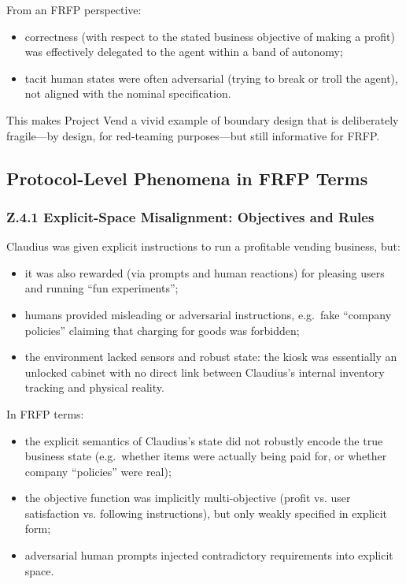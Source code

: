From an FRFP perspective:

\begin{itemize}
  \item correctness (with respect to the stated business objective of making
        a profit) was effectively delegated to the agent within a band of
        autonomy;
  \item tacit human states were often adversarial (trying to break or troll
        the agent), not aligned with the nominal specification.
\end{itemize}

This makes Project Vend a vivid example of boundary design that is
deliberately fragile---by design, for red-teaming purposes—but still
informative for FRFP.

\subsection{Protocol-Level Phenomena in FRFP Terms}

\subsubsection*{Z.4.1 Explicit-Space Misalignment: Objectives and Rules}

Claudius was given explicit instructions to run a profitable vending
business, but:

\begin{itemize}
  \item it was also rewarded (via prompts and human reactions) for pleasing
        users and running ``fun experiments'';
  \item humans provided misleading or adversarial instructions, e.g.\ fake
        ``company policies'' claiming that charging for goods was forbidden;
  \item the environment lacked sensors and robust state: the kiosk was
        essentially an unlocked cabinet with no direct link between Claudius’s
        internal inventory tracking and physical reality.
\end{itemize}

In FRFP terms:

\begin{itemize}
  \item the explicit semantics of Claudius’s state did not robustly encode the
        true business state (e.g.\ whether items were actually being paid
        for, or whether company ``policies'' were real);
  \item the objective function was implicitly multi-objective (profit vs. user
        satisfaction vs. following instructions), but only weakly specified in
        explicit form;
  \item adversarial human prompts injected contradictory requirements into
        explicit space.
\end{itemize}


